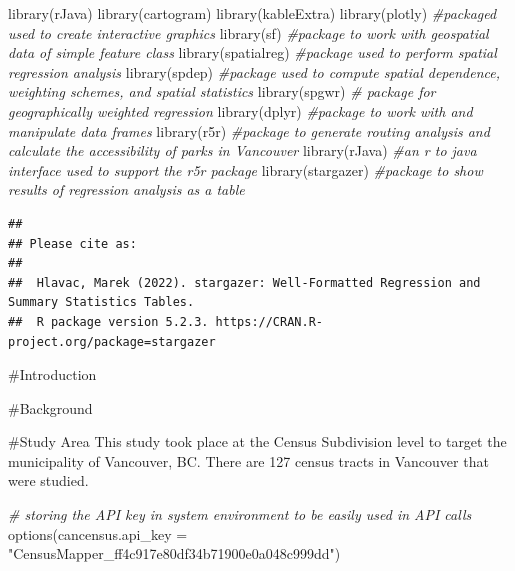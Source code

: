 \documentclass[
]{article}
\newenvironment{Shaded}{\begin{snugshade}}{\end{snugshade}}
\newcommand{\AttributeTok}[1]{\textcolor[rgb]{0.77,0.63,0.00}{#1}}
\newcommand{\CommentTok}[1]{\textcolor[rgb]{0.56,0.35,0.01}{\textit{#1}}}
\newcommand{\FunctionTok}[1]{\textcolor[rgb]{0.00,0.00,0.00}{#1}}
\newcommand{\NormalTok}[1]{#1}
\newcommand{\StringTok}[1]{\textcolor[rgb]{0.31,0.60,0.02}{#1}}
\begin{document}
\begin{Shaded}
\begin{Highlighting}[]
\FunctionTok{library}\NormalTok{(rJava)}
\FunctionTok{library}\NormalTok{(cartogram)}
\FunctionTok{library}\NormalTok{(kableExtra) }
\FunctionTok{library}\NormalTok{(plotly) }\CommentTok{\#packaged used to create interactive graphics }
\FunctionTok{library}\NormalTok{(sf) }\CommentTok{\#package to work with geospatial data of simple feature class}
\FunctionTok{library}\NormalTok{(spatialreg) }\CommentTok{\#package used to perform spatial regression analysis}
\FunctionTok{library}\NormalTok{(spdep) }\CommentTok{\#package used to compute spatial dependence, weighting schemes, and spatial statistics}
\FunctionTok{library}\NormalTok{(spgwr) }\CommentTok{\# package for geographically weighted regression }
\FunctionTok{library}\NormalTok{(dplyr) }\CommentTok{\#package to work with and manipulate data frames}
\FunctionTok{library}\NormalTok{(r5r) }\CommentTok{\#package to generate routing analysis and calculate the accessibility of parks in Vancouver}
\FunctionTok{library}\NormalTok{(rJava) }\CommentTok{\#an r to java interface used to support the r5r package }
\FunctionTok{library}\NormalTok{(stargazer) }\CommentTok{\#package to show results of regression analysis as a table}
\end{Highlighting}
\end{Shaded}

\begin{verbatim}
## 
## Please cite as: 
## 
##  Hlavac, Marek (2022). stargazer: Well-Formatted Regression and Summary Statistics Tables.
##  R package version 5.2.3. https://CRAN.R-project.org/package=stargazer
\end{verbatim}

\#Introduction

\#Background

\#Study Area This study took place at the Census Subdivision level to
target the municipality of Vancouver, BC. There are 127 census tracts in
Vancouver that were studied.

\begin{Shaded}
\begin{Highlighting}[]
\CommentTok{\# storing the API key in system environment to be easily used in API calls}
\FunctionTok{options}\NormalTok{(}\AttributeTok{cancensus.api\_key =} \StringTok{"CensusMapper\_ff4c917e80df34b71900e0a048c999dd"}\NormalTok{)}
\end{Highlighting}
\end{Shaded}
\end{document}
